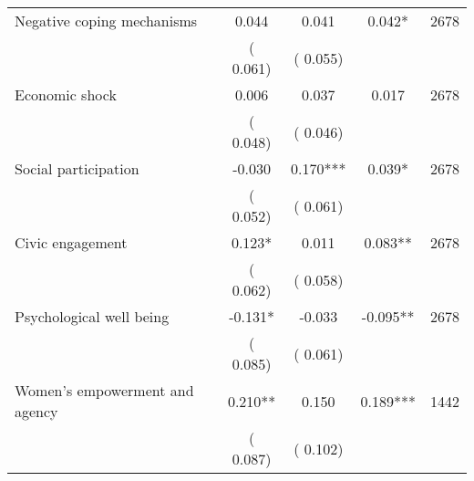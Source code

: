\begin{tabular}{l*{4}{c}}
 Negative coping mechanisms &              0.044 &         0.041 &           0.042* & 2678                       \\  
                 &        (       0.061)                   &        (       0.055)                        &                                                             &                                                      \\      

 Economic shock &              0.006 &         0.037 &           0.017 & 2678                       \\  
                 &        (       0.048)                   &        (       0.046)                        &                                                             &                                                      \\      

 Social participation &             -0.030 &         0.170*** &           0.039* & 2678                       \\  
                 &        (       0.052)                   &        (       0.061)                        &                                                             &                                                      \\      

 Civic engagement &              0.123* &         0.011 &           0.083** & 2678                       \\  
                 &        (       0.062)                   &        (       0.058)                        &                                                             &                                                      \\      

 Psychological well being &             -0.131* &        -0.033 &          -0.095** & 2678                       \\  
                 &        (       0.085)                   &        (       0.061)                        &                                                             &                                                      \\      

 Women's empowerment and agency &              0.210** &         0.150 &           0.189*** & 1442                       \\  
                 &        (       0.087)                   &        (       0.102)                        &                                                             &                                                      \\      


\end{tabular}
